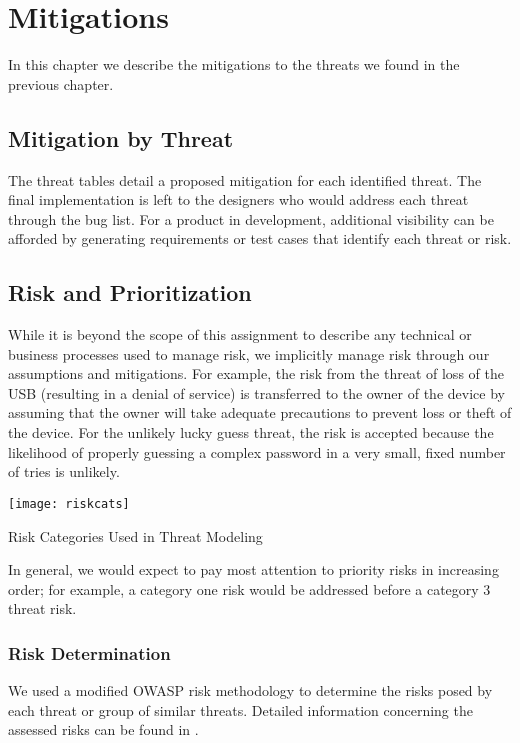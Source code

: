 \chapter{Mitigations}
\label{ch:mitigations}
In this chapter we describe the mitigations to the threats we found in
the previous chapter.

\section{Mitigation by Threat}
The threat tables detail a proposed mitigation for each identified
threat.  The final implementation is left to the designers who would
address each threat through the bug list. For a product in
development, additional visibility can be afforded by generating
requirements or test cases that identify each threat or risk.

\section{Risk and Prioritization}
\label{sec:risk}
While it is beyond the scope of this assignment to describe any technical or
business processes used to manage risk, we implicitly manage risk through our
assumptions and mitigations.  For example, the risk from the threat of loss of
the USB (resulting in a denial of service) is transferred to the owner of the
device by assuming that the owner will take adequate precautions to prevent loss
or theft of the device.  For the unlikely lucky guess threat, the risk is
accepted because the likelihood of properly guessing a complex password in a
very small, fixed number of tries is unlikely.

\begin{marginfigure}
    \centering
    \texttt{[image: riskcats]}
    \caption{Risk Categories Used in Threat Modeling}
    \label{fig:riskcats}
\end{marginfigure}

In general, we would expect to pay most attention to priority risks in
increasing order; for example, a category one risk would be addressed before a
category 3 threat risk.

\subsection{Risk Determination}
We used a modified OWASP risk methodology to determine the risks posed by each
threat or group of similar threats. Detailed information concerning the assessed
risks can be found in .
